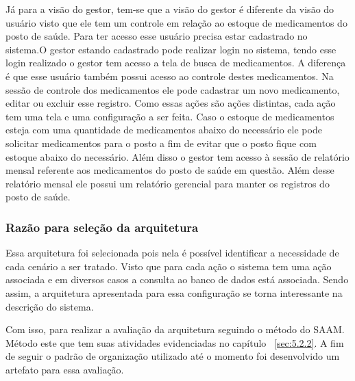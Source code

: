 Já para a visão do gestor, tem-se que a visão do gestor é diferente da visão do usuário visto que ele tem um controle em relação ao estoque de medicamentos do posto de saúde. Para ter acesso esse usuário precisa estar cadastrado no sistema.O gestor estando cadastrado pode realizar login no sistema, tendo esse login realizado o gestor tem acesso a tela de busca de medicamentos. A diferença é que esse usuário também possui acesso ao controle destes medicamentos.
Na sessão de controle dos medicamentos ele pode cadastrar um novo medicamento, editar ou excluir esse registro. Como essas ações são ações distintas, cada ação tem uma tela e uma configuração a ser feita.
Caso o estoque de medicamentos esteja com uma quantidade de medicamentos abaixo do necessário ele pode solicitar medicamentos para o posto a fim de evitar que o posto fique com estoque abaixo do necessário.
Além disso o gestor tem acesso à sessão de relatório mensal referente aos medicamentos do posto de saúde em questão.
Além desse relatório mensal ele possui um relatório gerencial para manter os registros do posto de saúde.

\subsubsection{Razão para seleção da arquitetura}

Essa arquitetura foi selecionada pois nela é possível identificar a necessidade de cada cenário a ser tratado. Visto que para cada ação o sistema tem uma ação associada e em diversos casos a consulta ao banco de dados está associada. Sendo assim, a arquitetura apresentada para essa configuração se torna interessante na descrição do sistema. 

Com isso, para realizar a avaliação da arquitetura seguindo o método do \acrfull{SAAM}. Método este que tem suas atividades evidenciadas no capítulo ~\ref{sec:5.2.2}. A fim de seguir o padrão de organização utilizado até o momento foi desenvolvido um artefato para essa avaliação.